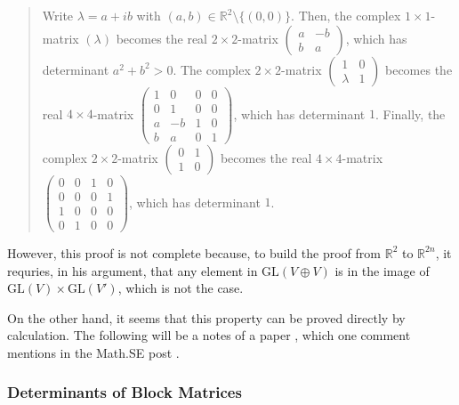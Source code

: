 \documentclass{article}
\numberwithin{equation}{subsection} %
\theoremstyle{definition}
\begin{document}
\begin{quote}
            Write $\lambda=a+ib$ with $(a,b) \in \mathbb{R}^2 \setminus \{(0,0)\}$. Then, the complex $1 \times 1$-matrix $(\lambda)$ becomes the real $2 \times 2$-matrix $\begin{pmatrix} a & -b \\ b & a \end{pmatrix}$, which has determinant $a^2+b^2 > 0$. The complex $2 \times 2$-matrix $\begin{pmatrix} 1 & 0 \\ \lambda & 1 \end{pmatrix}$ becomes the real $4 \times 4$-matrix
            $\begin{pmatrix}
            1 & 0 & 0 & 0 \\
            0 & 1 & 0 & 0 \\
            a & -b & 1 & 0 \\
            b & a & 0 & 1 \end{pmatrix}$, 
            which has determinant $1$. Finally, the complex $2 \times 2$-matrix  $\begin{pmatrix} 0 & 1 \\ 1 & 0 \end{pmatrix}$ becomes the real $4 \times 4$-matrix $\begin{pmatrix} 0 & 0 & 1 & 0 \\ 0 & 0 & 0 & 1\\ 1 & 0 & 0 & 0 \\ 0 & 1 & 0 & 0 \end{pmatrix}$, which has determinant $1$.

        \end{quote}

        However, this proof is not complete because, to build the proof from 
        $\mathbb{R}^2$ to $\mathbb{R}^{2n}$, it requries, in his argument, that
        any element in $\mathrm{GL}(V\oplus V)$ is in the image of
        $\mathrm{GL}(V)\times \mathrm{GL}(V')$, which is not the case.

        On the other hand, it seems that this property can be proved directly
        by calculation. The following will be a notes of a paper 
        \cite{determinants_of_block_m}, which one comment mentions 
        in the Math.SE post \cite{math.se_2}.


        \subsubsection{Determinants of Block Matrices}
        \label{sec:Determinants of Block Matrices}
        
\end{document}

